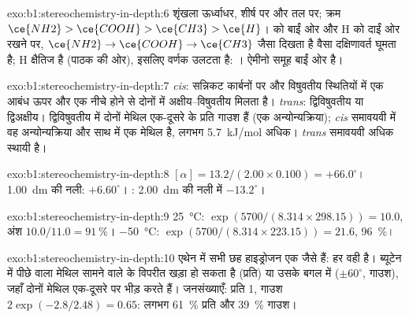 \begin{solution}{exo:b1:stereochemistry-in-depth:6}
शृंखला ऊर्ध्वाधर,  शीर्ष पर और  तल पर; क्रम
$\ce{NH2} > \ce{COOH} > \ce{CH3} > \ce{H}$।  को बाईं ओर
और H को दाईं ओर रखने पर, $\ce{NH2} \to \ce{COOH} \to \ce{CH3}$ जैसा दिखता है वैसा
दक्षिणावर्त घूमता है; H क्षैतिज है (पाठक की ओर), इसलिए वर्णक
उलटता है: । ऐमीनो समूह बाईं ओर है।
\end{solution}

\begin{solution}{exo:b1:stereochemistry-in-depth:7}
\textit{cis}: सन्निकट कार्बनों पर  और विषुवतीय स्थितियों में एक आबंध ऊपर और एक
नीचे होने से दोनों  में अक्षीय--विषुवतीय मिलता है।
\textit{trans}: द्विविषुवतीय या द्विअक्षीय। द्विविषुवतीय  में दोनों
मेथिल एक-दूसरे के प्रति गाउश हैं (एक अन्योन्यक्रिया); \textit{cis}
समावयवी में वह अन्योन्यक्रिया और साथ में एक  मेथिल है, लगभग \qty{5.7}{kJ/mol}
अधिक। \textit{trans} समावयवी अधिक स्थायी है।
\end{solution}

\begin{solution}{exo:b1:stereochemistry-in-depth:8}
$[\alpha] = 13.2/(2.00 \times 0.100) = +66.0^\circ$। \qty{1.00}{dm} की नली:
$+6.60^\circ$। : \qty{2.00}{dm} की नली में $-13.2^\circ$।
\end{solution}

\begin{solution}{exo:b1:stereochemistry-in-depth:9}
\qty{25}{\celsius}: $\exp(5700/(8.314 \times 298.15)) = 10.0$, अंश
$10.0/11.0 = \qty{91}{\percent}$। \qty{-50}{\celsius}: $\exp(5700/(8.314
\times 223.15)) = 21.6$, \qty{96}{\percent}।
\end{solution}

\begin{solution}{exo:b1:stereochemistry-in-depth:10}
एथेन में सभी छह हाइड्रोजन एक जैसे हैं: हर 
वही है। ब्यूटेन में पीछे वाला मेथिल सामने वाले के विपरीत खड़ा हो सकता है
(प्रति) या उसके बगल में ($\pm 60^\circ$, गाउश), जहाँ दोनों मेथिल एक-दूसरे पर
भीड़ करते हैं। जनसंख्याएँ: प्रति 1, गाउश $2\exp(-2.8/2.48) = 0.65$: लगभग
\qty{61}{\percent} प्रति और \qty{39}{\percent} गाउश।
\end{solution}

